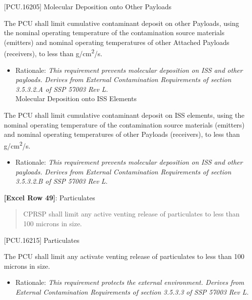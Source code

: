 [PCU.16205] Molecular Deposition onto Other Payloads

The PCU shall limit cumulative contaminant deposit on other Payloads, using the nominal operating temperature of the contamination source materials (emitters) and nominal operating temperatures of other Attached Payloads (receivers), to less than  g\slash cm\textsuperscript{2}\slash s.

\begin{itemize}
\item{} Rationale: \emph{This requirement prevents molecular deposition on ISS and other payloads. Derives from External Contamination Requirements of section 3.5.3.2.A of SSP 57003 Rev L.}\\
[PCU.16210] Molecular Deposition onto ISS Elements

\end{itemize}

The PCU shall limit cumulative contaminant deposit on ISS elements, using the nominal operating temperature of the contamination source materials (emitters) and nominal operating temperatures of other Payloads (receivers), to less than  g\slash cm\textsuperscript{2}\slash s.

\begin{itemize}
\item{} Rationale: \emph{This requirement prevents molecular deposition on ISS and other payloads. Derives from External Contamination Requirements of section 3.5.3.2.B of SSP 57003 Rev L.}

\end{itemize}

\textbf{[Excel Row 49]}: Particulates

\begin{quote}
CPRSP shall limit any active venting release of particulates to less than 100 microns in size.
\end{quote}

[PCU.16215] Particulates

The PCU shall limit any activate venting release of particulates to less than 100 microns in size.

\begin{itemize}
\item{} Rationale: \emph{This requirement protects the external environment. Derives from External Contamination Requirements of section 3.5.3.3 of SSP 57003 Rev L.}

\end{itemize}


